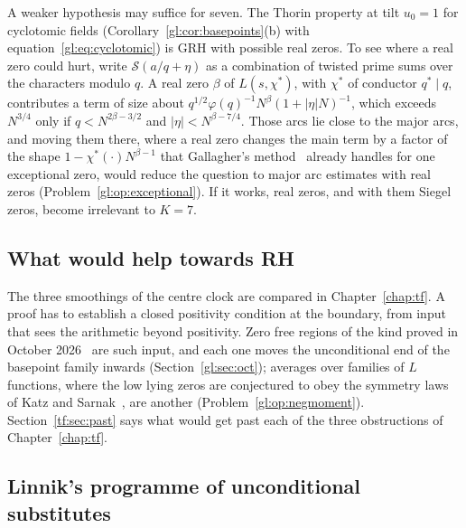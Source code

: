 A weaker hypothesis may suffice for seven. The Thorin property at tilt $u_0=1$ for cyclotomic fields (Corollary~\ref{gl:cor:basepoints}(b) with equation~\eqref{gl:eq:cyclotomic}) is GRH with possible real zeros. To see where a real zero could hurt, write $\mathcal S(a/q+\eta)$ as a combination of twisted prime sums over the characters modulo $q$. A real zero $\beta$ of $L(s,\chi^*)$, with $\chi^*$ of conductor $q^*\mid q$, contributes a term of size about $q^{1/2}\varphi(q)^{-1}N^\beta(1+|\eta|N)^{-1}$, which exceeds $N^{3/4}$ only if $q<N^{2\beta-3/2}$ and $|\eta|<N^{\beta-7/4}$. Those arcs lie close to the major arcs, and moving them there, where a real zero changes the main term by a factor of the shape $1-\chi^*(\cdot)N^{\beta-1}$ that Gallagher's method~\cite{Gallagher75} already handles for one exceptional zero, would reduce the question to major arc estimates with real zeros (Problem~\ref{gl:op:exceptional}). If it works, real zeros, and with them Siegel zeros, become irrelevant to $K=7$.

\subsection{What would help towards RH}\label{gl:sec:rh}

The three smoothings of the centre clock are compared in Chapter~\ref{chap:tf}. A proof has to establish a closed positivity condition at the boundary, from input that sees the arithmetic beyond positivity. Zero free regions of the kind proved in October 2026~\cite{OAI26a} are such input, and each one moves the unconditional end of the basepoint family inwards (Section~\ref{gl:sec:oct}); averages over families of $L$ functions, where the low lying zeros are conjectured to obey the symmetry laws of Katz and Sarnak~\cite{KatzSarnak99}, are another (Problem~\ref{gl:op:negmoment}). Section~\ref{tf:sec:past} says what would get past each of the three obstructions of Chapter~\ref{chap:tf}.

\subsection{Linnik's programme of unconditional substitutes}\label{xi:sec:linnik}

